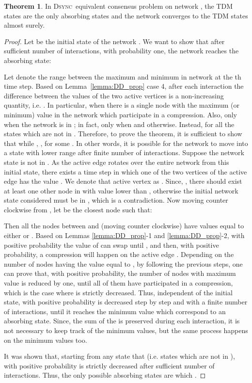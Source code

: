 \documentclass[conference]{IEEEtran}
\newcommand{\DDD}{\textsc{Dsync~}}
\theoremstyle{definition}
\theoremstyle{definition}
\newtheorem{theorem}{Theorem}
\begin{document}
\begin{theorem}\label{thm:convergence}
In \DDD equivalent consensus problem on network , the TDM states are the only absorbing states and the network converges to the TDM states almost surely.
\end{theorem}
\begin{proof}
Let  be the initial state of the network . We want to show that after sufficient number of interactions, with probability one, the network reaches the absorbing state:
 
Let  denote the range between the maximum and minimum  in network  at the th time step. 
Based on Lemma~\ref{lemma:DD_prop} case 4, after each interaction the difference between the values of the two active vertices is a non-increasing quantity, i.e. . In particular,  when there is a single node with the maximum (or minimum) value in the network which participate in a compression. Also,  only when the network is in ; in fact,  only when  and  otherwise. Instead,  for all the states which are not in . Therefore, to prove the theorem, it is sufficient to show that while , , for some . In other words, it is possible for the network to move into a state with lower range after finite number of interactions. Suppose the network state is not in . As the active edge rotates over the entire network from this initial state, there exists a time step  in which one of the two vertices of the active edge has the value . We denote that active vertex as . Since, , there should exist at least one other node in  with value lower than , otherwise the initial network state considered must be in , which is a contradiction. Now moving counter clockwise from , let  be the closest node such that: 

Then all the nodes between  and  (moving counter clockwise) have values equal to either  or . Based on Lemmas \ref{lemma:DD_prop}-1 and \ref{lemma:DD_prop}-2, with positive probability the  value of  can swap until  , and then, with positive probability, a compression will happen on the active edge . Depending on the number of nodes having the value equal to , by following the previous steps, one can prove that, with positive probability, the number of nodes with maximum value is reduced by one, until all of them have participated in a compression, which is the case where  is strictly decreased. Thus, independent of the initial state, with positive probability  is decreased step by step and with a finite number of interactions, until it reaches the minimum value which correspond to an absorbing state.  Since, the sum of the  is preserved during each interaction, it is not necessary to keep track of the minimum values, but the same process happens on the minimum values too.

It was shown that, starting from any state that  (i.e. states which are not in ), with positive probability  is strictly decreased after sufficient number of interactions. Thus, the only possible absorbing states are  which .
\end{proof}
\end{document}
